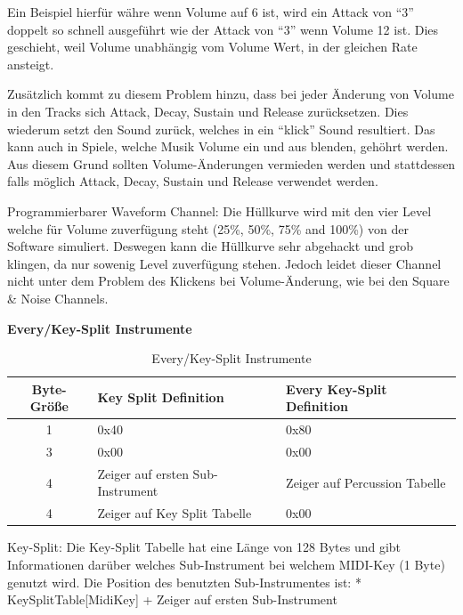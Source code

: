 \documentclass[11pt,a4paper]{scrartcl}
\begin{document}
Ein Beispiel hierf\"{u}r w\"{a}hre wenn Volume auf 6 ist, wird ein Attack von "`3"' doppelt so schnell ausgef\"{u}hrt wie der Attack von "`3"' wenn Volume 12 ist. Dies geschieht, weil Volume unabh\"{a}ngig vom Volume Wert, in der gleichen Rate ansteigt.

Zus\"{a}tzlich kommt zu diesem Problem hinzu, dass bei jeder \"{A}nderung von Volume in den Tracks sich Attack, Decay, Sustain und Release zur\"{u}cksetzen. Dies wiederum setzt den Sound zur\"{u}ck, welches in ein "`klick"' Sound resultiert. Das kann auch in Spiele, welche Musik Volume ein und aus blenden, geh\"{o}hrt werden. Aus diesem Grund sollten Volume-\"{A}nderungen vermieden werden und stattdessen falls m\"{o}glich Attack, Decay, Sustain und Release verwendet werden.

Programmierbarer Waveform Channel:\newline
Die H\"{u}llkurve wird mit den vier Level welche f\"{u}r Volume zuverf\"{u}gung steht (25\%, 50\%, 75\% and 100\%) von der Software simuliert. Deswegen kann die H\"{u}llkurve sehr abgehackt und grob klingen, da nur sowenig Level zuverf\"{u}gung stehen. Jedoch leidet dieser Channel nicht unter dem Problem des Klickens bei Volume-\"{A}nderung, wie bei den Square \& Noise Channels.



\newpage

\textbf{{\large Every/Key-Split Instrumente}}

\begin{table}[h]
    \centering
    \begin{tabular}{ c | p{} | p{}}
        \textbf{Byte-Gr\"{o}{\ss}e} & \textbf{Key Split Definition} & \textbf{Every Key-Split Definition}\\
        \hline
        1 & 0x40 & 0x80\\
				\hline
        3 & 0x00 & 0x00\\
				\hline
        4 & Zeiger auf ersten Sub-Instrument & Zeiger auf Percussion Tabelle \\
				\hline
        4 & Zeiger auf Key Split Tabelle & 0x00\\
    \end{tabular}
    \caption{Every/Key-Split Instrumente}
    \label{table:EveryKey-SplitInstrument}
\end{table}


Key-Split:\newline
Die Key-Split Tabelle hat eine L\"{a}nge von 128 Bytes und gibt Informationen dar\"{u}ber welches Sub-Instrument bei welchem MIDI-Key (1 Byte) genutzt wird. 
Die Position des benutzten Sub-Instrumentes ist: * KeySplitTable[MidiKey] + Zeiger auf ersten Sub-Instrument
\end{document}
